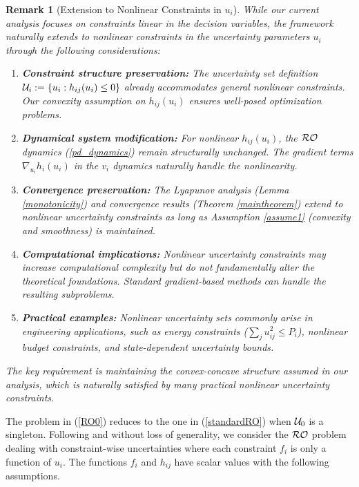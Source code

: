 \documentclass[journal,twoside,web]{ieeecolor}
\newtheorem{remark}{Remark}
\begin{document}
{\color{blue} \begin{remark}[Extension to Nonlinear Constraints in $u_i$]
While our current analysis focuses on constraints linear in the decision variables, the framework naturally extends to nonlinear constraints in the uncertainty parameters $u_i$ through the following considerations:

\begin{enumerate}
\item \textbf{Constraint structure preservation:} The uncertainty set definition ${\cal U}_i := \{u_i : h_{ij}(u_i) \leq 0\}$ already accommodates general nonlinear constraints. Our convexity assumption on $h_{ij}(u_i)$ ensures well-posed optimization problems.

\item \textbf{Dynamical system modification:} For nonlinear $h_{ij}(u_i)$, the ${\cal RO}$ dynamics (\ref{pd_dynamics}) remain structurally unchanged. The gradient terms $\nabla_{u_i} h_i(u_i)$ in the $v_i$ dynamics naturally handle the nonlinearity.

\item \textbf{Convergence preservation:} The Lyapunov analysis (Lemma \ref{monotonicity}) and convergence results (Theorem \ref{maintheorem}) extend to nonlinear uncertainty constraints as long as Assumption \ref{assume1} (convexity and smoothness) is maintained.

\item \textbf{Computational implications:} Nonlinear uncertainty constraints may increase computational complexity but do not fundamentally alter the theoretical foundations. Standard gradient-based methods can handle the resulting subproblems.

\item \textbf{Practical examples:} Nonlinear uncertainty sets commonly arise in engineering applications, such as energy constraints ($\sum_j u_{ij}^2 \leq P_i$), nonlinear budget constraints, and state-dependent uncertainty bounds.
\end{enumerate}

The key requirement is maintaining the convex-concave structure assumed in our analysis, which is naturally satisfied by many practical nonlinear uncertainty constraints.
\end{remark}}

The problem in (\ref{RO0}) reduces to the one in (\ref{standardRO}) when ${\cal U}_0$ is a singleton.
Following \cite{bental2009-2} and without loss of generality, we consider the ${\cal RO}$ problem dealing with constraint-wise uncertainties where each constraint $f_i$ is only a function of $u_i$.
The functions $f_i$ and $h_{ij}$ have scalar values with the following assumptions.
\end{document}
